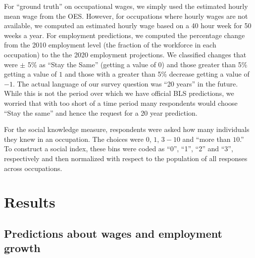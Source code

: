 \documentclass[11pt]{article}
\newcommand{\qu}[1]{``#1''}
\begin{document}
For ``ground truth'' on occupational wages, we simply used the estimated hourly mean wage from the OES.
However, for occupations where hourly wages are not available, we computed an estimated hourly wage based on a 40 hour week for 50 weeks a year.  
For employment predictions, we computed the percentage change from the 2010 employment level (the fraction of the workforce in each occupation) to the the 2020 employment projections. 
We classified changes that were $\pm$ 5\% as ``Stay the Same'' (getting a value of $0$) and those greater than 5\% getting a value of $1$ and those with a greater than 5\% decrease getting a value of $-1$.  
The actual language of our survey question was ``20 years'' in the future. 
While this is not the period over which we have official BLS predictions, we worried that with too short of a time period many respondents would choose ``Stay the same'' and hence the request for a 20 year prediction. 


For the social knowledge measure, respondents were asked how many individuals they knew in an occupation. 
The choices were $0$, $1$, $3-10$ and \qu{more than $10$.} 
To construct a social index, these bins were coded as ``0'', ``1'', ``2'' and ``3'', respectively and then normalized with respect to the population of all responses across occupations.



\section{Results}

\subsection{Predictions about wages and employment growth}
\end{document}
